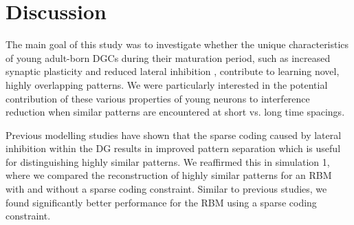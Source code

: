 \section{Discussion}

The main goal of this study was to investigate whether the unique characteristics of young 
adult-born \acp{DGC} during their maturation period, such as increased synaptic plasticity and 
reduced lateral inhibition \citep{enhanced_synaptic_plasticity, marin-burgin-et-al-12}, 
contribute to learning novel, highly overlapping patterns.
We were particularly interested in the potential contribution of
these various properties of young neurons to interference reduction when
similar patterns are encountered at short vs. long time spacings.

Previous modelling studies have shown that the sparse coding caused by lateral inhibition within
the \ac{DG} results in improved pattern separation \citep{oreilly_hippocampal_encoding_storage_and_recall} 
which is useful for distinguishing highly similar patterns. 
We reaffirmed this in simulation 1, where we compared the reconstruction
of highly similar patterns for an \ac{RBM} with and without a sparse coding constraint. 
Similar to previous studies, we found significantly better performance 
for the \ac{RBM} using a sparse coding constraint.

